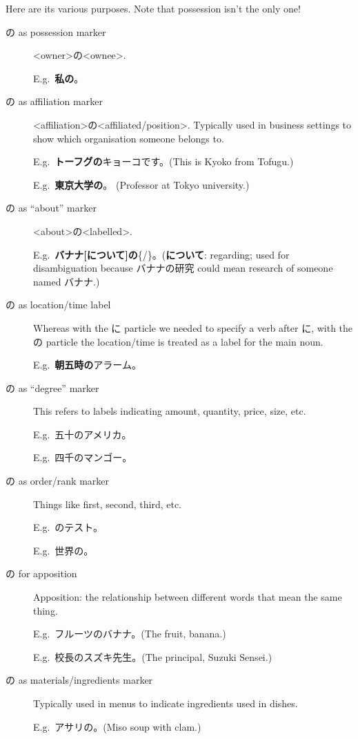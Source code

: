 \documentclass[../nihongo-gakushuu-kyouzai.tex]{subfiles}
\begin{document}
Here are its various purposes. Note that possession isn't the only one!
\begin{description}
    \item[の as possession marker] <owner>の<ownee>.

    E.g.\ \textbf{私の}。
    \item[の as affiliation marker] <affiliation>の<affiliated/position>. Typically used in business settings to show which organisation someone belongs to.

    E.g.\ \textbf{トーフグの}キョーコです。(This is Kyoko from Tofugu.)

    E.g.\ \textbf{東京大学の}。 (Professor at Tokyo university.)
    \item[の as ``about'' marker] <about>の<labelled>.

    E.g.\ \textbf{バナナ[について]の}\{/\}。(\textbf{について}: regarding; used for disambiguation because バナナの研究 could mean research of someone named バナナ.)
    \item[の as location/time label] Whereas with the に particle we needed to specify a verb after に, with the の particle the location/time is treated as a label for the main noun.

    E.g.\ \textbf{朝五時の}アラーム。
    \item[の as ``degree'' marker] This refers to labels indicating amount, quantity, price, size, etc.

    E.g.\ 五十のアメリカ。

    E.g.\ 四千のマンゴー。
    \item[の as order/rank marker] Things like first, second, third, etc.

    E.g.\ のテスト。

    E.g.\ 世界の。
    \item[の for apposition] Apposition: the relationship between different words that mean the same thing.

    E.g.\ フルーツのバナナ。(The fruit, banana.)

    E.g.\ 校長のスズキ先生。(The principal, Suzuki Sensei.)
    \item[の as materials/ingredients marker] Typically used in menus to indicate ingredients used in dishes.

    E.g.\ アサリの。(Miso soup with clam.)


\end{description}
\end{document}
